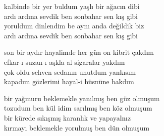 \documentclass[10pt, openright, oneside]{memoir}
\theoremstyle{definition}
\begin{document}
\vspace*{\fill}
%
\newpage
{}
\vspace*{\fill}
\settowidth{\versewidth}{kalbinde bir yer buldum yaşlı bir ağacın dibi}
\begin{cverse}
  kalbinde bir yer buldum yaşlı bir ağacın dibi \\
  ardı ardına sevdik ben sonbahar sen kış gibi \\
  yoruldum dinlendim be aynı anda değildik biz \\
  ardı ardına sevdik ben sonbahar sen kış gibi \\
\end{cverse}
\vspace*{\fill}
%
\newpage
{}
\vspace*{\fill}
\settowidth{\versewidth}{son bir aydır hayalimde her gün on kibrit çakdım}
\begin{cverse}
  son bir aydır hayalimde her gün on kibrit çakdım \\
  efkar-ı suzan-ı aşkla al sigaralar yakdım \\
  çok oldu sehven sedanın unutdum yankısını \\
  kapadım gözlerimi hayal-i hüsnüne bakdım \\
\end{cverse}
\vspace*{\fill}
%
\newpage
{}
\vspace*{\fill}
\settowidth{\versewidth}{bir yağmuru beklemekle yanılmış ben güz olmuşum}
\begin{cverse}
  bir yağmuru beklemekle yanılmış ben güz olmuşum \\
  tozudum ben kül idim sarılmış ben köz olmuşum \\
  bir kürede sıkışmış karanlık ve yapayalnız \\
  kırmayı beklemekle yorulmuş ben dün olmuşum \\
\end{cverse}
\vspace*{\fill}
%
\end{document}
